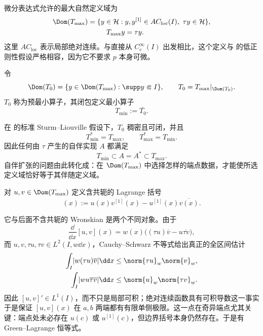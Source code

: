 \begin{definition}[最大算子与最小算子]
微分表达式允许的最大自然定义域为
\begin{equation*}\begin{aligned}
 \Dom(T_{\max})
 =\{y\in\mathcal H:\;&y,y^{[1]}\in AC_{\mathrm{loc}}(I),\ \tau y\in\mathcal H\},\\
 T_{\max}y&=\tau y.
\end{aligned}
\end{equation*}
这里 $AC_{\mathrm{loc}}$ 表示局部绝对连续。与直接从 $C_c^\infty(I)$ 出发相比，这个定义与 的低正则性假设严格相容，因为它不要求 $p$ 本身可微。

令
\[
 \Dom(T_0)=\{y\in\Dom(T_{\max}):\supp y\Subset I\},\qquad T_0=T_{\max}|_{\Dom(T_0)}.
\]
$T_0$ 称为预最小算子，其闭包定义最小算子
\begin{equation*}T_{\min}:=\overline{T_0}.
\end{equation*}
\end{definition}

\begin{theorem}[最小与最大算子的伴随关系]
在 的标准 Sturm--Liouville 假设下，$T_0$ 稠密且可闭，并且
\begin{equation}\label{eq:math-sl-minmax-adjoint}
 T_{\min}^*=T_{\max},\qquad T_{\max}^*=T_{\min}.
\end{equation}
因此任何由 $\tau$ 产生的自伴实现 $A$ 都满足
\[
 T_{\min}\subset A=A^*\subset T_{\max}.
\]
自伴扩张的问题由此转化成：在 $\Dom(T_{\max})$ 中选择怎样的端点数据，才能使所选定义域恰好等于其伴随定义域。
\end{theorem}

\begin{definition}[Lagrange 括号]
对 $u,v\in\Dom(T_{\max})$ 定义含共轭的 Lagrange 括号
\begin{equation*}[u,v](x):=u(x)\overline{v^{[1]}(x)}-u^{[1]}(x)\overline{v(x)}.
\end{equation*}
\end{definition}

它与后面不含共轭的 Wronskian 是两个不同对象。由于
\[
 \frac{\dd}{\dd x}[u,v](x)
 =w(x)\bigl((\tau u)\overline v-u\overline{\tau v}\bigr),
\]
而 $u,v,\tau u,\tau v\in L^2(I,w\dd x)$，Cauchy--Schwarz 不等式给出真正的全区间估计
\[
\begin{aligned}
 \int_I\lvert w(\tau u)\overline v\rvert\dd x
 &\le \norm{\tau u}_w\norm{v}_w,\\
 \int_I\lvert wu\overline{\tau v}\rvert\dd x
 &\le \norm{u}_w\norm{\tau v}_w.
\end{aligned}
\]
因此 $[u,v]'\in L^1(I)$，而不只是局部可积；绝对连续函数具有可积导数这一事实于是保证 $[u,v](x)$ 在 $a,b$ 两端都有有限单侧极限。这一点在奇异端点尤其关键：端点处未必存在 $u(c)$ 或 $u^{[1]}(c)$，但边界括号本身仍然存在。于是有 Green--Lagrange 恒等式。

